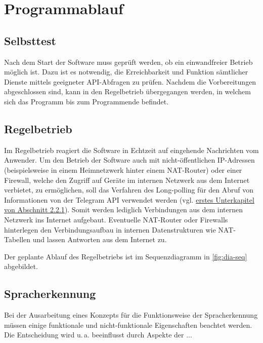 \section{Programmablauf}

\subsection{Selbsttest}
\label{sec:grundsaetzlicher-aufbau}

Nach dem Start der Software muss geprüft werden, ob ein einwandfreier Betrieb möglich ist. Dazu ist es notwendig, die Erreichbarkeit und Funktion sämtlicher Dienste mittels geeigneter API-Abfragen zu prüfen. Nachdem die Vorbereitungen abgeschlossen sind, kann in den Regelbetrieb übergegangen werden, in welchem sich das Programm bis zum Programmende befindet. 

\subsection{Regelbetrieb}

Im Regelbetrieb reagiert die Software in Echtzeit auf eingehende Nachrichten vom Anwender. 
Um den Betrieb der Software auch mit nicht-öffentlichen IP-Adressen (beispielsweise in einem Heimnetzwerk hinter einem NAT-Router) oder einer Firewall, welche den Zugriff auf Geräte im internen Netzwerk aus dem Internet verbietet, zu ermöglichen, soll das Verfahren des Long-polling für den Abruf von Informationen von der Telegram API verwendet werden (vgl. \hyperref[sec:telegram-getting-updates]{erstes Unterkapitel von Abschnitt 2.2.1}). Somit werden lediglich Verbindungen aus dem internen Netzwerk ins Internet aufgebaut. Eventuelle NAT-Router oder Firewalls hinterlegen den Verbindungsaufbau in internen Datenstrukturen wie NAT-Tabellen und lassen Antworten aus dem Internet zu.

Der geplante Ablauf des Regelbetriebs ist im Sequenzdiagramm in \autoref{fig:dia-seq} abgebildet.

\subsection{Spracherkennung}

Bei der Ausarbeitung eines Konzepts für die Funktionsweise der Spracherkennung müssen einige funktionale und nicht-funktionale Eigenschaften beachtet werden. Die Entscheidung wird u.\,a. beeinflusst durch Aspekte der ... 

